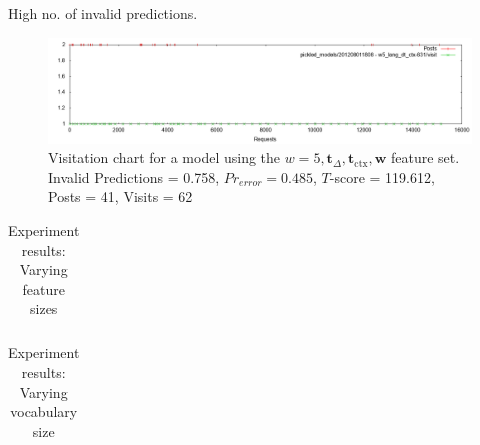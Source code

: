 \documentclass[12 pt]{article}
\begin{document}
	High no. of invalid predictions.
\begin{landscape}
\begin{figure}
	\centering
	\includegraphics[scale=0.5]{example_seq.png}
	\caption{Visitation chart for a model using the $w=5, \mathbf{t}_\Delta, \mathbf{t}_{\text{ctx}},\mathbf{w}$ feature set. Invalid Predictions = 0.758, $Pr_{error} =  0.485$, $T$-score = 119.612, Posts = 41, Visits = 62}
\end{figure}
\end{landscape}

\begin{table}
	\footnotesize
	\begin{centering}
	\begin{tabular}{|l|c|c|c|c|c|c|c|c|}
	\hline
	
	\hline
	\end{tabular}
	\caption{Experiment results: Varying feature sizes}
	\label{expt1}
\end{centering}
\end{table}

\begin{table}
	\footnotesize
	\begin{centering}
	\begin{tabular}{|l|c|c|c|c|c|c|c|c|}
	\hline
	
	\hline
	\end{tabular}
	\caption{Experiment results: Varying vocabulary size}
	\label{expt1}
\end{centering}
\end{table}


\



\end{document}

